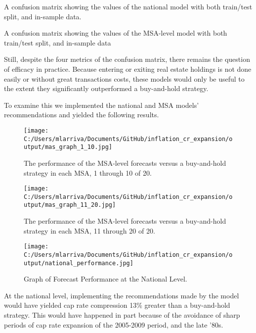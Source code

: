 \documentclass[jrfm,article,submit,oneauthor,pdftex]{Definitions/mdpi}
\begin{document}
\begin{table}[H] 
\caption{A confusion matrix showing the values of the national model with both train/test split, and in-sample data.\label{tab1}}
\end{table}

\begin{table}[H]
\caption{A confusion matrix showing the values of the MSA-level model with both train/test split, and in-sample data\label{tab1}}
\end{table}

Still, despite the four metrics of the confusion matrix, there remains the question of efficacy in practice. Because entering or exiting real estate holdings is not done easily or without great transactions costs, these models would only be useful to the extent they significantly outperformed a buy-and-hold strategy.

To examine this we implemented the national and MSA models' recommendations and yielded the following results.

\begin{figure}[H]
\texttt{[image: C:/Users/mlarriva/Documents/GitHub/inflation\_cr\_expansion/output/mas\_graph\_1\_10.jpg]}
\caption{The performance of the MSA-level forecasts versus a buy-and-hold strategy in each MSA, 1 through 10 of 20.\label{fig1}}
\end{figure}   
\unskip

\begin{figure}[H]
\texttt{[image: C:/Users/mlarriva/Documents/GitHub/inflation\_cr\_expansion/output/mas\_graph\_11\_20.jpg]}
\caption{The performance of the MSA-level forecasts versus a buy-and-hold strategy in each MSA, 11 through 20 of 20.\label{fig1}}
\end{figure}

\begin{figure}[H]
\texttt{[image: C:/Users/mlarriva/Documents/GitHub/inflation\_cr\_expansion/output/national\_performance.jpg]}
\caption{Graph of Forecast Performance at the National Level.\label{fig1}}
\end{figure}

At the national level, implementing the recommendations made by the model would have yielded cap rate compression 13\% greater than a buy-and-hold strategy. This would have happened in part because of the avoidance of sharp periods of cap rate expansion of the 2005-2009 period, and the late '80s.
\end{document}
